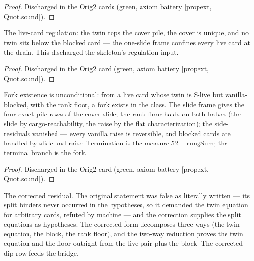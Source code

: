 \begin{proof}
\leanok
Discharged in the Orig2 cards (green, axiom battery [propext, Quot.sound]).
\end{proof}

\begin{theorem}\label{thm:oneSlideLive}
\leanok
{}
The live-card regulation: the twin tops the cover pile, the
cover is unique, and no twin sits below the blocked card --- the
one-slide frame confines every live card at the drain.  This
discharged the skeleton's regulation input.
\end{theorem}

\begin{proof}
\leanok
Discharged in the Orig2 card (green, axiom battery [propext, Quot.sound]).
\end{proof}

\begin{theorem}\label{thm:drainComplete}
\leanok
{}
Fork existence is unconditional: from a live card whose twin is
S-live but vanilla-blocked, with the rank floor, a fork exists
in the class.  The slide frame gives the four exact pile rows of
the cover slide; the rank floor holds on both halves (the slide
by cargo-reachability, the raise by the flat characterization);
the side-residuals vanished --- every vanilla raise is
reversible, and blocked cards are handled by slide-and-raise.
Termination is the measure $52 - \mathrm{rungSum}$; the terminal
branch is the fork.
\end{theorem}

\begin{proof}
\leanok
Discharged in the Orig2 card (green, axiom battery [propext, Quot.sound]).
\end{proof}

\begin{theorem}\label{thm:splitResidual}
\leanok
{}
The corrected residual.  The original statement was false as
literally written --- its split binders never occurred in the
hypotheses, so it demanded the twin equation for arbitrary
cards, refuted by machine --- and the correction supplies the
split equations as hypotheses.  The corrected form decomposes
three ways (the twin equation, the block, the rank floor), and
the two-way reduction proves the twin equation and the floor
outright from the live pair plus the block.  The corrected dip
row feeds the bridge.
\end{theorem}

